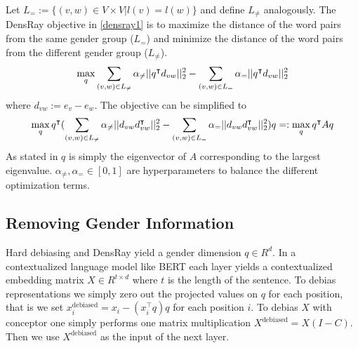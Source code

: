 Let $L_{=}:=\{(v,w)\in V\times V|l(v)=l(w)\}$ and define
$L_{\neq}$ analogously.  The DensRay objective
in \eqref{densray1} is to maximize the distance of the word
pairs from the same gender group ($L_{=}$) and minimize the
distance of the word pairs from the different gender group
($L_{\neq}$).
\begin{eqnarray}
\max\limits_{q} 
\sum_{(v,w)\in L_{\neq}}\alpha_{\neq}||q^\intercal d_{vw}||^2_2
-\sum_{(v,w)\in L_{=}}\alpha_{=}||q^\intercal d_{vw}||^2_2
\eqlabel{densray1}
\end{eqnarray}
where $d_{vw}:=e_v-e_w$. The objective can be simplified to 
\begin{eqnarray}
\max \limits_{q} q^\intercal(
\sum_{(v,w)\in L_{\neq}}\alpha_{\neq}||d_{vw}d_{vw}^\intercal ||^2_2-\sum_{(v,w)\in L_{=}}\alpha_{=}||d_{vw}d_{vw}^\intercal ||^2_2)q=:\max\limits_{q} q^\intercal Aq
\eqlabel{eq:densray2}
\end{eqnarray}
As stated in \cite{dufter2019analytical} $q$ is simply the eigenvector of $A$ corresponding to the largest eigenvalue.
$\alpha_{\neq},\alpha_{=}\in [0,1]$ are hyperparameters to balance the different optimization terms. 


\subsection{Removing Gender Information}

Hard debiasing and DensRay yield a gender dimension $q \in R^d$. In a contextualized language model like BERT each layer yields a contextualized embedding matrix $X \in R^{t \times d}$ where $t$ is the length of the sentence. To debias representations we simply zero out the projected values on $q$ for each position, that is we set $x^{\text{debiased}}_i = x_i -  (x_i^\intercal q) q$ for each position $i$.
To debias $X$ with conceptor one simply performs one matrix multiplication $X^{\text{debiased}}=X(I-C)$. Then we use $X^{\text{debiased}}$ as the input of the next layer.

